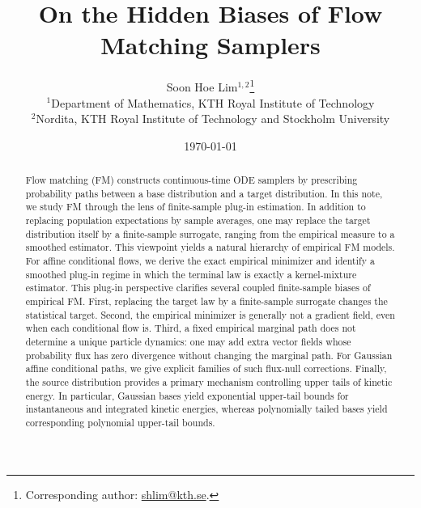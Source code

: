 \documentclass[a4paper,11pt]{article}
\title{\bf On the Hidden Biases of  Flow Matching Samplers}
\author{
	Soon Hoe Lim$^{1,2}$\thanks{Corresponding author: \url{shlim@kth.se}.} \vspace{+0.3cm} \\ 
	$^1$Department of Mathematics, KTH Royal Institute of Technology \\
	$^2$Nordita, KTH Royal Institute of Technology and Stockholm University 
}
\date{\today}
\theoremstyle{plain}
\theoremstyle{definition}
\begin{document}
\maketitle


\begin{abstract}
Flow matching (FM) constructs continuous-time ODE samplers by prescribing probability paths
between a base distribution and a target distribution. In this note, we study FM through the lens of finite-sample plug-in estimation. In addition to replacing population expectations by sample
averages, one may replace the target distribution itself by a finite-sample surrogate, ranging
from the empirical measure to a smoothed estimator.
This viewpoint yields a natural hierarchy of empirical FM models. For affine conditional flows, we derive the exact empirical minimizer and identify a smoothed plug-in regime in
which the terminal law is exactly a kernel-mixture estimator. 
This plug-in perspective clarifies several coupled finite-sample biases of empirical FM.
First, replacing the target law by a finite-sample surrogate changes the statistical target.
Second, the empirical minimizer is generally not a gradient field, even when each conditional flow is.
Third, a fixed empirical marginal path does not determine a unique particle dynamics: one may add extra vector fields whose probability flux has zero divergence without changing the marginal path. For Gaussian affine conditional paths, we give explicit families of such flux-null corrections. Finally, the source distribution provides a primary mechanism controlling upper tails of kinetic energy. In particular, Gaussian bases yield exponential upper-tail bounds for instantaneous and integrated kinetic energies, whereas polynomially tailed bases yield corresponding polynomial upper-tail bounds. %


\end{abstract}
\end{document}
